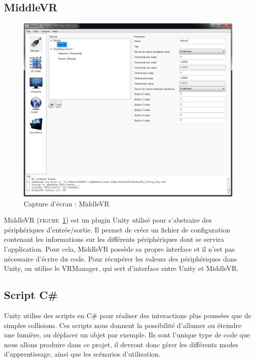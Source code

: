 \subsection{MiddleVR}
\begin{figure}[h]
  \includegraphics[width=1\textwidth]{4-conception/img/middlevr_screenshot.png}
  \caption{Capture d'écran : MiddleVR}
  \label{middlevr}
\end{figure}
MiddleVR (\textsc{figure~\ref{middlevr}}) est un plugin Unity utilisé pour s'abstraire des périphériques d'entrée/sortie. Il permet de créer un fichier de configuration contenant les informations sur les différents périphériques dont se servira l'application. Pour cela, MiddleVR possède sa propre interface et il n'est pas nécessaire d'écrire du code.
Pour récupérer les valeurs des périphériques dans Unity, on utilise le VRManager, qui sert d'interface entre Unity et MiddleVR.

\subsection{Script C\#}
Unity utilise des scripts en C\# pour réaliser des interactions plus poussées que de simples collisions. Ces scripts nous donnent la possibilité d'allumer ou éteindre une lumière, ou déplacer un objet par exemple. Ils sont l'unique type de code que nous allons produire dans ce projet, il devront donc gérer les différents modes d'apprentissage, ainsi que les scénarios d'utilisation.\newline

